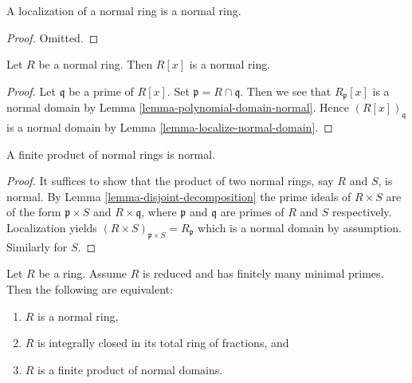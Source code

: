 \begin{lemma}
\label{lemma-localization-normal-ring}
A localization of a normal ring is a normal ring.
\end{lemma}

\begin{proof}
Omitted.
\end{proof}

\begin{lemma}
\label{lemma-polynomial-ring-normal}
Let $R$ be a normal ring. Then $R[x]$ is a normal ring.
\end{lemma}

\begin{proof}
Let $\mathfrak q$ be a prime of $R[x]$. Set $\mathfrak p = R \cap \mathfrak q$.
Then we see that $R_{\mathfrak p}[x]$ is a normal domain by
Lemma \ref{lemma-polynomial-domain-normal}.
Hence $(R[x])_{\mathfrak q}$ is a normal domain by
Lemma \ref{lemma-localize-normal-domain}.
\end{proof}

\begin{lemma}
\label{lemma-finite-product-normal}
A finite product of normal rings is normal.
\end{lemma}

\begin{proof}
It suffices to show that the product of two normal rings, say $R$ and $S$, is
normal. By Lemma \ref{lemma-disjoint-decomposition} the prime ideals of
$R\times S$ are of the form $\mathfrak{p}\times S$ and $R\times
\mathfrak{q}$, where $\mathfrak{p}$ and $\mathfrak{q}$ are primes of $R$
and $S$ respectively. Localization yields 
$(R\times S)_{\mathfrak{p}\times S}=R_{\mathfrak{p}}$ which is a normal domain
by assumption. Similarly for $S$.
\end{proof}

\begin{lemma}
\label{lemma-characterize-reduced-ring-normal}
Let $R$ be a ring. Assume $R$ is reduced and has finitely many
minimal primes. Then the following are equivalent:
\begin{enumerate}
\item $R$ is a normal ring,
\item $R$ is integrally closed in its total ring of fractions, and
\item $R$ is a finite product of normal domains.
\end{enumerate}
\end{lemma}

